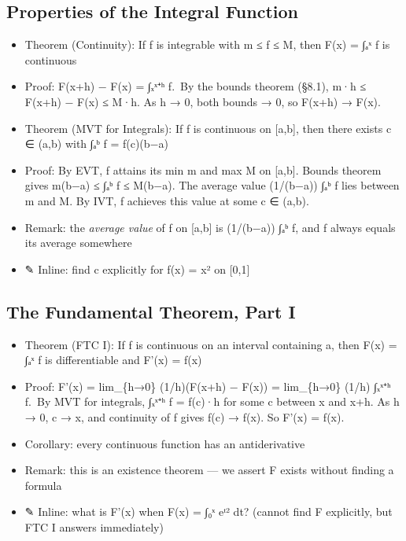 \documentclass[
  10pt,
  letterpaper,
]{scrbook}
\providecommand{\tightlist}{%
  \setlength{\itemsep}{0pt}\setlength{\parskip}{0pt}}
\begin{document}
\subsection{Properties of the Integral
Function}\label{properties-of-the-integral-function}

\begin{itemize}
\tightlist
\item
  Theorem (Continuity): If f is integrable with m ≤ f ≤ M, then F(x) =
  ∫ₐˣ f is continuous
\item
  Proof: F(x+h) − F(x) = ∫ₓˣ⁺ʰ f.~By the bounds theorem (§8.1), m·h ≤
  F(x+h) − F(x) ≤ M·h. As h → 0, both bounds → 0, so F(x+h) → F(x).
\item
  Theorem (MVT for Integrals): If f is continuous on {[}a,b{]}, then
  there exists c ∈ (a,b) with ∫ₐᵇ f = f(c)(b−a)
\item
  Proof: By EVT, f attains its min m and max M on {[}a,b{]}. Bounds
  theorem gives m(b−a) ≤ ∫ₐᵇ f ≤ M(b−a). The average value (1/(b−a)) ∫ₐᵇ
  f lies between m and M. By IVT, f achieves this value at some c ∈
  (a,b).
\item
  Remark: the \emph{average value} of f on {[}a,b{]} is (1/(b−a)) ∫ₐᵇ f,
  and f always equals its average somewhere
\item
  ✎ Inline: find c explicitly for f(x) = x² on {[}0,1{]}
\end{itemize}

\subsection{The Fundamental Theorem, Part
I}\label{the-fundamental-theorem-part-i}

\begin{itemize}
\tightlist
\item
  Theorem (FTC I): If f is continuous on an interval containing a, then
  F(x) = ∫ₐˣ f is differentiable and F'(x) = f(x)
\item
  Proof: F'(x) = lim\_\{h→0\} (1/h)(F(x+h) − F(x)) = lim\_\{h→0\} (1/h)
  ∫ₓˣ⁺ʰ f.~By MVT for integrals, ∫ₓˣ⁺ʰ f = f(c)·h for some c between x
  and x+h. As h → 0, c → x, and continuity of f gives f(c) → f(x). So
  F'(x) = f(x).
\item
  Corollary: every continuous function has an antiderivative
\item
  Remark: this is an existence theorem --- we assert F exists without
  finding a formula
\item
  ✎ Inline: what is F'(x) when F(x) = ∫₀ˣ eᵗ² dt? (cannot find F
  explicitly, but FTC I answers immediately)
\end{itemize}
\end{document}

